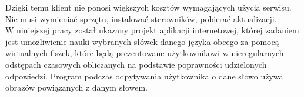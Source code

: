 Dzięki temu klient nie ponosi większych kosztów wymagających użycia serwisu. Nie musi wymieniać sprzętu, instalować sterowników, pobierać aktualizacji. \\

\vspace{1cm}
W niniejszej pracy został ukazany projekt aplikacji internetowej, której zadaniem jest umożliwienie nauki wybranych słówek danego języka obcego za pomocą wirtualnych fiszek, które będą prezentowane użytkownikowi w nieregularnych odstępach czasowych obliczanych na podstawie poprawności udzielonych odpowiedzi. Program podczas odpytywania użytkownika o dane słowo używa obrazów powiązanych z danym słowem. 



